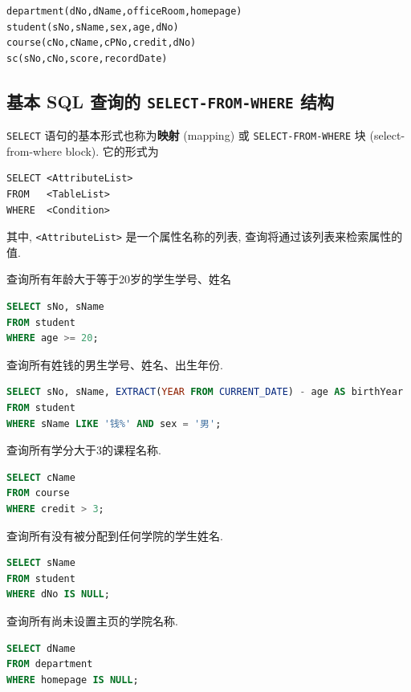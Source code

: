 \documentclass[10pt,UTF8]{book} %
\begin{document}
\begin{lstlisting}
department(dNo,dName,officeRoom,homepage)
student(sNo,sName,sex,age,dNo)
course(cNo,cName,cPNo,credit,dNo)
sc(sNo,cNo,score,recordDate)
\end{lstlisting}


\subsection{基本 SQL 查询的 \lstinline|SELECT-FROM-WHERE| 结构}

\lstinline|SELECT| 语句的基本形式也称为\textbf{映射} (mapping) 或
\lstinline|SELECT-FROM-WHERE| 块 (select-from-where block). 它的形式为
\begin{lstlisting}
SELECT <AttributeList>
FROM   <TableList>
WHERE  <Condition>
\end{lstlisting}
其中, \lstinline|<AttributeList>| 是一个属性名称的列表, 查询将通过该列表来检索属性的值.

\begin{example}
    查询所有年龄大于等于20岁的学生学号、姓名
\begin{lstlisting}[language=SQL]
SELECT sNo, sName
FROM student
WHERE age >= 20;
\end{lstlisting}
\end{example}


\begin{example}
    查询所有姓钱的男生学号、姓名、出生年份.
    \begin{lstlisting}[language=SQL]
SELECT sNo, sName, EXTRACT(YEAR FROM CURRENT_DATE) - age AS birthYear
FROM student
WHERE sName LIKE '钱%' AND sex = '男';
    \end{lstlisting}
\end{example}

\begin{example}
    查询所有学分大于3的课程名称.
    \begin{lstlisting}[language=SQL]
SELECT cName
FROM course
WHERE credit > 3;
    \end{lstlisting}
\end{example}


\begin{example}
    查询所有没有被分配到任何学院的学生姓名.
    \begin{lstlisting}[language=SQL]
SELECT sName
FROM student
WHERE dNo IS NULL;
    \end{lstlisting}
\end{example}
\begin{example}
    查询所有尚未设置主页的学院名称.
    \begin{lstlisting}[language=SQL]
SELECT dName
FROM department
WHERE homepage IS NULL;
    \end{lstlisting}
\end{example}
\end{document}
